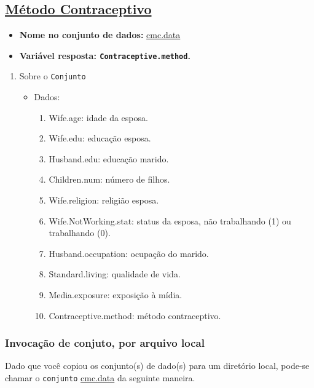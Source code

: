 \documentclass[12pt]{article}
\begin{document}
\subsection{\href{https://archive.ics.uci.edu/ml/datasets/Contraceptive+Method+Choice}{Método Contraceptivo}}
\label{sec:org57eb7d3}
\begin{itemize}
\item \textbf{Nome no conjunto de dados:} \href{https://drive.google.com/file/d/1M774v2s0uxQorn7w-ASPOfpPoAb93I2m/view?usp=sharing}{cmc.data}
\item \textbf{Variável resposta:  \texttt{Contraceptive.method}.}
\end{itemize}
\begin{enumerate}
\item Sobre o \texttt{Conjunto}
\label{sec:org9d9ddef}
\begin{itemize}
\item Dados:
\begin{enumerate}
\item Wife.age: idade da esposa.
\item Wife.edu: educação esposa.
\item Husband.edu: educação marido.
\item Children.num: número de filhos.
\item Wife.religion: religião esposa.
\item Wife.NotWorking.stat: status da esposa, não trabalhando (1) ou trabalhando (0).
\item Husband.occupation: ocupação do marido.
\item Standard.living: qualidade de vida.
\item Media.exposure: exposição à mídia.
\item Contraceptive.method: método contraceptivo.
\end{enumerate}
\end{itemize}
\end{enumerate}

\subsubsection{Invocação de conjuto, por arquivo local}
\label{sec:orgc54fb90}

Dado que você copiou os conjunto(s) de dado(s) para um diretório
local, pode-se chamar o \texttt{conjunto} \href{https://drive.google.com/file/d/1M774v2s0uxQorn7w-ASPOfpPoAb93I2m/view?usp=sharing}{cmc.data} da seguinte maneira.
\end{document}

